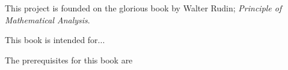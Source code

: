 
This project is founded on the glorious book by Walter Rudin; \emph{Principle of
Mathematical Analysis}\cite{rudin}.

This book is intended for...

The prerequisites for this book are
